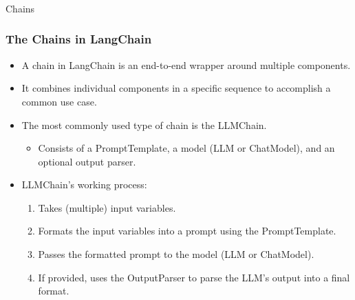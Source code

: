 \begin{frame}[fragile]\frametitle{}
\begin{center}
{\Large Chains}
\end{center}
\end{frame}

\begin{frame}[fragile]
\frametitle{The Chains in LangChain}

\begin{itemize}
    \item A chain in LangChain is an end-to-end wrapper around multiple components.
    \item It combines individual components in a specific sequence to accomplish a common use case.
    \item The most commonly used type of chain is the LLMChain.
    \begin{itemize}
        \item Consists of a PromptTemplate, a model (LLM or ChatModel), and an optional output parser.
    \end{itemize}
    \item LLMChain's working process:
    \begin{enumerate}
        \item Takes (multiple) input variables.
        \item Formats the input variables into a prompt using the PromptTemplate.
        \item Passes the formatted prompt to the model (LLM or ChatModel).
        \item If provided, uses the OutputParser to parse the LLM's output into a final format.
    \end{enumerate}
\end{itemize}

\end{frame}

